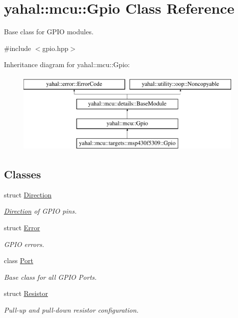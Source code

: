 \hypertarget{classyahal_1_1mcu_1_1_gpio}{}\section{yahal\+:\+:mcu\+:\+:Gpio Class Reference}
\label{classyahal_1_1mcu_1_1_gpio}


Base class for G\+P\+I\+O modules.  




{\ttfamily \#include $<$gpio.\+hpp$>$}

Inheritance diagram for yahal\+:\+:mcu\+:\+:Gpio\+:\begin{figure}[H]
\begin{center}
\leavevmode
\includegraphics[height=4.000000cm]{classyahal_1_1mcu_1_1_gpio}
\end{center}
\end{figure}
\subsection*{Classes}
\begin{DoxyCompactItemize}
\item 
struct \hyperlink{structyahal_1_1mcu_1_1_gpio_1_1_direction}{Direction}
\begin{DoxyCompactList}\small\item\em \hyperlink{structyahal_1_1mcu_1_1_gpio_1_1_direction}{Direction} of G\+P\+I\+O pins. \end{DoxyCompactList}\item 
struct \hyperlink{structyahal_1_1mcu_1_1_gpio_1_1_error}{Error}
\begin{DoxyCompactList}\small\item\em G\+P\+I\+O errors. \end{DoxyCompactList}\item 
class \hyperlink{classyahal_1_1mcu_1_1_gpio_1_1_port}{Port}
\begin{DoxyCompactList}\small\item\em Base class for all G\+P\+I\+O Ports. \end{DoxyCompactList}\item 
struct \hyperlink{structyahal_1_1mcu_1_1_gpio_1_1_resistor}{Resistor}
\begin{DoxyCompactList}\small\item\em Pull-\/up and pull-\/down resistor configuration. \end{DoxyCompactList}\end{DoxyCompactItemize}
